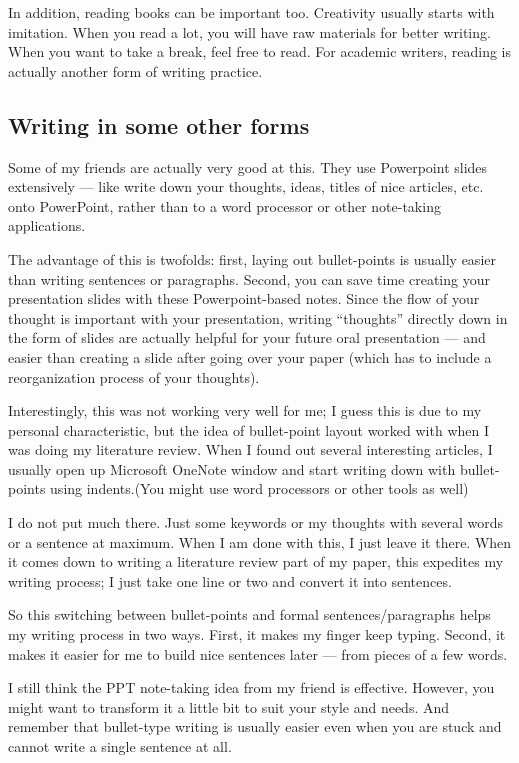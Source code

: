 \documentclass[11pt]{article}
\begin{document}
In addition, reading books can be important too. Creativity usually starts
with imitation. When you read a lot, you will have raw materials for better
writing.  When you want to take a break, feel free to read. For academic
writers, reading is actually another form of writing practice.

\subsection{Writing in some other forms}
Some of my friends are actually very good at this. They use Powerpoint slides
extensively --- like write down your thoughts, ideas, titles of nice articles,
etc. onto PowerPoint, rather than to a word processor or other note-taking
applications.

The advantage of this is twofolds: first, laying out bullet-points is usually
easier than writing sentences or paragraphs. Second, you can save time
creating your presentation slides with these Powerpoint-based notes. Since
the flow of your thought is important with your presentation, writing
``thoughts'' directly down in the form of slides are actually helpful for your
future oral presentation --- and easier than creating a slide after going
over your paper (which has to include a reorganization process of your
thoughts).

Interestingly, this was not working very well for me; I guess this is due to
my personal characteristic, but the idea of bullet-point layout worked with
when I was doing my literature review. When I found out several interesting
articles, I usually open up Microsoft OneNote window and start writing down
with bullet-points using indents.(You might use word processors or other tools
as well)

I do not put much there. Just some keywords or my thoughts with several words
or a sentence at maximum. When I am done with this, I just leave it there.
When it comes down to writing a literature review part of my paper, this
expedites my writing process; I just take one line or two and convert it into
sentences. 

So this switching between bullet-points and formal sentences/paragraphs helps
my writing process in two ways. First, it makes my finger keep typing. Second,
it makes it easier for me to build nice sentences later --- from pieces of a
few words.

I still think the PPT note-taking idea from my friend is effective. However,
you might want to transform it a little bit to suit your style and needs. And
remember that bullet-type writing is usually easier even when you are stuck
and cannot write a single sentence at all.
\end{document}
